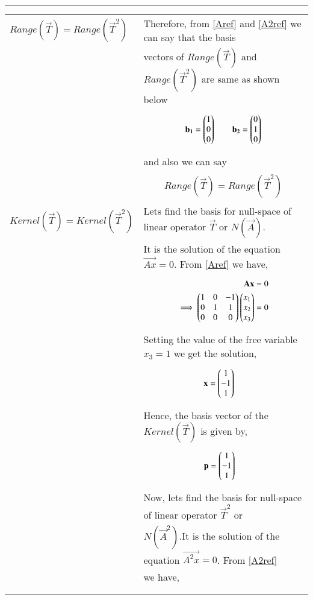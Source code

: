 \documentclass[journal,12pt]{IEEEtran}
\begin{document}
\begin{longtable}{|l|l|}
{\begin{align}
\end{align}}\\
\hline $Range(\vec{T})=Range(\vec{T}^2)$&Therefore, from \eqref{Aref} and \eqref{A2ref} we can say that the basis\\&vectors of $Range(\vec{T})$ and $Range(\vec{T}^2)$ are same as shown below\\&\parbox{11cm}{\begin{align}
    \mathbf{b_1}=\begin{pmatrix}1\\0\\0\end{pmatrix}\quad\quad\mathbf{b_2}=\begin{pmatrix}0\\1\\0\end{pmatrix}\label{basis}
\end{align}}\\&and also we can say\\&\parbox{11cm}{\begin{align}
    Range(\vec{T})=Range(\vec{T}^2)\label{exp1}
\end{align}}\\
\hline
$Kernel(\vec{T})=Kernel(\vec{T}^2)$&Lets find the basis for null-space of linear operator $\vec{T}$ or $N(\vec{A})$.\\&It is the solution of the equation $\vec{Ax}=0$. From \eqref{Aref} we have,\\&\parbox{11cm}{\begin{align}
\mathbf{Ax} &= 0\\
\implies\begin{pmatrix}1&0&-1\\0&1&1\\0&0&0\end{pmatrix}\begin{pmatrix}x_1\\x_2\\x_3\end{pmatrix} &= 0
\end{align}}\\&Setting the value of the free variable $x_3 = 1$ we get the solution,\\&\parbox{11cm}{
\begin{align}
\mathbf{x} &= \begin{pmatrix}1\\-1\\1\end{pmatrix}
\end{align}}\\&Hence, the basis vector of the $Kernel(\vec{T})$ is given by,\\&\parbox{11cm}{
\begin{align}
\mathbf{p} &= \begin{pmatrix}1\\-1\\1\end{pmatrix}\label{bp1}
\end{align}}\\&Now, lets find the basis for null-space of linear operator $\vec{T}^2$ or\\&$N(\vec{A}^2)$.It is the solution of the equation $\vec{A^2x}=0$. From \eqref{A2ref}\\&we have,\\&\parbox{11cm}{\begin{align}

\end{align}}
\end{longtable}
\end{document}
